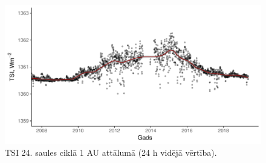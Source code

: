 \begin{figure}[h]
    \centering
    \includegraphics[width=\linewidth]{figures/misc/TSI_8-19.pdf}
    \caption{TSI 24. saules ciklā 1 AU attālumā (24 h vidējā vērtība)\cite{TSIdata}.}
    \label{fig:TSI1}
\end{figure}